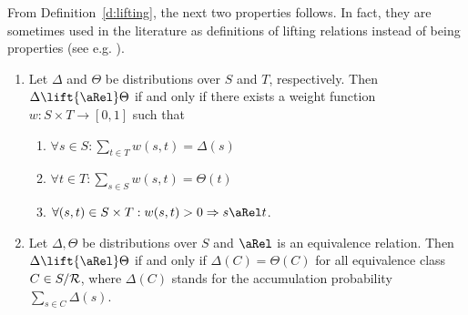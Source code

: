 \documentclass{article}
\begin{document}
From Definition~\ref{d:lifting}, the next two properties follows. In
fact, they are sometimes used in the literature as definitions of
lifting relations instead of being properties (see e.g.
\cite{SL94,LS91}).
\begin{theorem}\label{t:lifting.alternative}
\begin{enumerate}
\item Let $\Delta$ and $\Theta$ be distributions over $S$ and $T$,
  respectively. Then
  $\Delta \lift{\aRel} \Theta$ if and only if there
  exists a weight function $w:S\times T \rightarrow [0,1]$ such that
  \begin{enumerate}
  \item $\forall s\in S: \sum_{t\in T}w(s,t) = \Delta(s)$
  \item $\forall t\in T: \sum_{s\in S}w(s,t) = \Theta(t)$
  \item $\forall (s,t)\in S\times T: w(s,t) > 0 \Rightarrow s\aRel t$.
  \end{enumerate}
\item Let $\Delta,\Theta$ be distributions over  $S$ and
 $\aRel$ is an equivalence relation. Then
$\Delta \lift{\aRel} \Theta$ if and only if $\Delta(C)=\Theta(C)$
for all equivalence class $C\in S/{\cal R}$, where $\Delta(C)$
stands for the accumulation probability $\sum_{s\in C}\Delta(s)$.
\end{enumerate}
\end{theorem}
\end{document}
